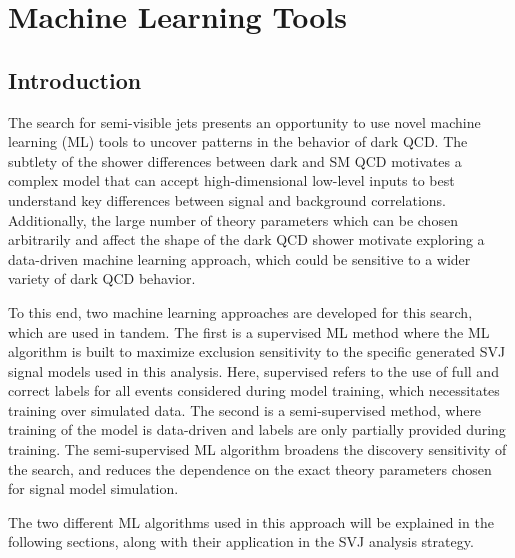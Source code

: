 \chapter{Machine Learning Tools}
\label{ch:ml_tools}

\section{Introduction}
The search for semi-visible jets presents an opportunity to use novel machine learning (ML) tools to uncover patterns in the behavior of dark QCD. The subtlety of the shower differences between dark and SM QCD motivates a complex model that can accept high-dimensional low-level inputs to best understand key differences between signal and background correlations. Additionally, the large number of theory parameters which can be chosen arbitrarily and affect the shape of the dark QCD shower motivate exploring a data-driven machine learning approach, which could be sensitive to a wider variety of dark QCD behavior. \par

To this end, two machine learning approaches are developed for this search, which are used in tandem. The first is a supervised ML method where the ML algorithm is built to maximize exclusion sensitivity to the specific generated SVJ signal models used in this analysis. Here, supervised refers to the use of full and correct labels for all events considered during model training, which necessitates training over simulated data. The second is a semi-supervised method, where training of the model is data-driven and labels are only partially provided during training. The semi-supervised ML algorithm broadens the discovery sensitivity of the search, and reduces the dependence on the exact theory parameters chosen for signal model simulation. \par

The two different ML algorithms used in this approach will be explained in the following sections, along with their application in the SVJ analysis strategy.


